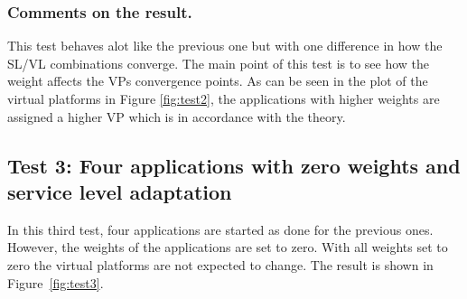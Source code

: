 \documentclass[nobiblatex]{LTHthesis}
\begin{document}
\subsubsection{Comments on the result.} 
This test behaves alot like the previous one but with one difference in how 
the SL/VL combinations converge. The main point of this test is to see how the 
weight affects the VPs convergence points.
As can be seen in the plot of the virtual platforms in Figure \ref{fig:test2}, 
the applications with higher weights are assigned a higher VP which is in 
accordance with the theory.

\subsection{Test 3: Four applications with zero weights and 
  service level adaptation}

In this third test, four applications are started as done for the previous
ones. However, the weights of the applications are set to zero. With all
weights set to zero the virtual platforms are not expected to change.
The result is shown in Figure~\ref{fig:test3}.
\end{document}
